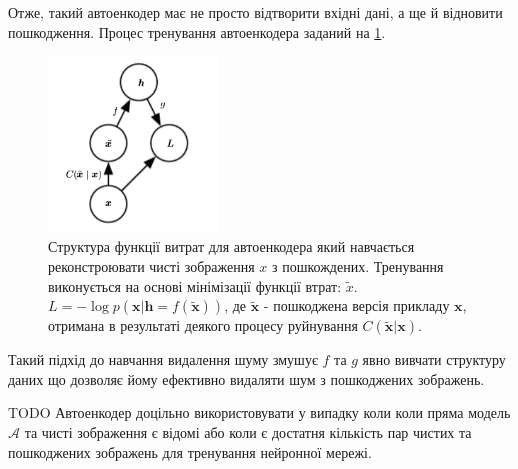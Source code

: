\documentclass[14pt,a4paper]{extarticle}
\newcounter{e}
\numberwithin{equation}{section}
\numberwithin{figure}{section}
\begin{document}
	Отже, такий автоенкодер має не просто відтворити вхідні дані, а ще й відновити пошкодження. Процес тренування автоенкодера заданий на \ref{fig:dae-graph}.
	\begin{figure}[h]
		\centering
		\includegraphics[width=0.4\textwidth]{resources/dae_graph.png}
		\caption{
			Структура функції витрат для автоенкодера який навчається реконстроювати чисті зображення $x$ з пошкождених. Тренування виконується на основі мінімізації функції втрат: $\tilde{x}$.  $L = - \log p (\boldsymbol {x} | \boldsymbol {h} = f (\tilde {\boldsymbol {x}}))$, де $\tilde {\boldsymbol {x}}$ - пошкоджена версія прикладу $\boldsymbol {x}$, отримана в результаті деякого процесу руйнування $C (\tilde {\boldsymbol {x}} | \boldsymbol {x})$. \cite{Goodfellow-et-al-2016}
		}
		\label{fig:dae-graph}
	\end{figure}
		
	Такий підхід до навчання видалення шуму змушує $f$ та $g$ явно вивчати структуру даних що дозволяє йому ефективно видаляти шум з пошкоджених зображень.

	TODO
	Автоенкодер доцільно використовувати у випадку коли коли пряма модель $\mathcal{A}$ та чисті зображення є відомі або коли є достатня кількість пар чистих та пошкоджених зображень для тренування нейронної мережі. 


\end{document}
